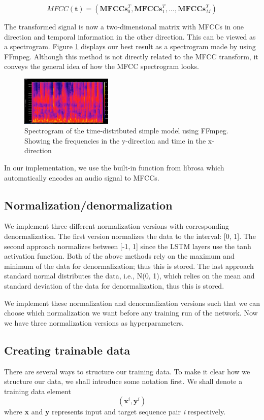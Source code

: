 \documentclass[conference]{IEEEtran}
\begin{document}
\[MFCC(\textbf{t}) = (\textbf{MFCCs}_0^T, \textbf{MFCCs}_1^T, ..., \textbf{MFCCs}_M^T)\]

The transformed signal is now a two-dimensional matrix with MFCCs in one direction and temporal information in the other direction. This can be viewed as a spectrogram. Figure \ref{fig1} displays our best result as a spectrogram made by using FFmpeg. Although this method is not directly related to the MFCC transform, it conveys the general idea of how the MFCC spectrogram looks.

\begin{figure}[ht] 
  \centering %
  \includegraphics[width=0.39\textwidth]{./best/spectrogram.jpg} 
  \caption{Spectrogram of the time-distributed simple model using FFmpeg. Showing the frequencies in the y-direction and time in the x-direction}
  \label{fig1} 
\end{figure}

In our implementation, we use the built-in function from librosa which automatically encodes an audio signal to MFCCs. 

\subsection{Normalization/denormalization}
We implement three different normalization versions with corresponding denormalization. The first version normalizes the data to the interval: [0, 1]. The second approach normalizes between [-1, 1] since the LSTM layers use the tanh activation function. Both of the above methods rely on the maximum and minimum of the data for denormalization; thus this is stored. The last approach standard normal distributes the data, i.e., N(0, 1), which relies on the mean and standard deviation of the data for denormalization, thus this is stored.

We implement these normalization and denormalization versions such that we can choose which normalization we want before any training run of the network. Now we have three normalization versions as hyperparameters.

\subsection{Creating trainable data}
There are several ways to structure our training data. To make it clear how we structure our data, we shall introduce some notation first. We shall denote a training data element 
\[ (\textbf{x}^i,\textbf{y}^i)\] 
where \textbf{x} and \textbf{y} represents  input and target sequence pair \textit{i} respectively. 
\end{document}
